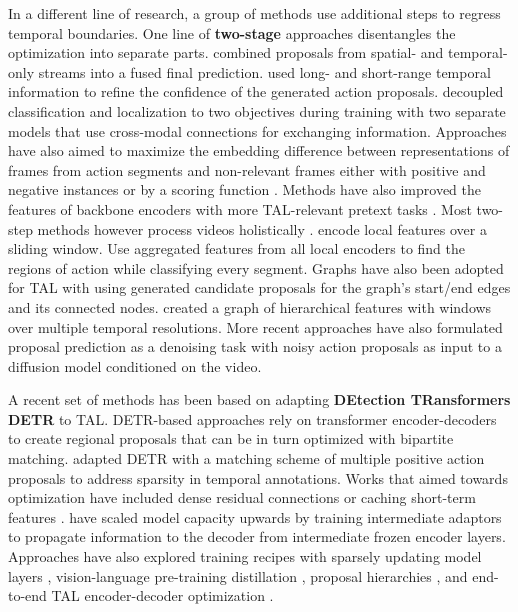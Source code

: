 \documentclass[smallextended,twocolumn,natbib]{svjour3}
\begin{document}
In a different line of research, a group of methods use additional steps to regress temporal boundaries. One line of \textbf{two-stage} approaches disentangles the optimization into separate parts. \citet{zhai2020two} combined proposals from spatial- and temporal-only streams into a fused final prediction. \citet{chen2022dcan} used long- and short-range temporal information to refine the confidence of the generated action proposals. \citet{huang2019decoupling} decoupled classification and localization to two objectives during training with two separate models that use cross-modal connections for exchanging information. Approaches have also aimed to maximize the embedding difference between representations of frames from action segments and non-relevant frames either with positive and negative instances \citep{luo2020weakly,zhang2021cola} or by a scoring function \citep{rizve2023pivotal}. Methods have also improved the features of backbone encoders with more TAL-relevant pretext tasks \citep{zhang2022unsupervised}. Most two-step methods however process videos holistically \citep{alwassel2021tsp,he2022asm,liu2021weakly,qing2021temporal}. \citet{alwassel2021tsp} encode local features over a sliding window. Use aggregated features from all local encoders to find the regions of action while classifying every segment. Graphs have also been adopted for TAL with \citet{bai2020boundary} using generated candidate proposals for the graph's start/end edges and its connected nodes. \citet{zhao2021video} created a graph of hierarchical features with windows over multiple temporal resolutions. More recent approaches \citep{nag2023difftad} have also formulated proposal prediction as a denoising task with noisy action proposals as input to a diffusion model conditioned on the video.

A recent set of methods has been based on adapting \textbf{DEtection TRansformers DETR} \citep{carion2020end} to TAL. DETR-based approaches rely on transformer encoder-decoders to create regional proposals that can be in turn optimized with bipartite matching. \citet{tan2021relaxed} adapted DETR with a matching scheme of multiple positive action proposals to address sparsity in temporal annotations. Works that aimed towards optimization have included dense residual connections \citep{zhao2023re2tal} or caching short-term features \citep{cheng2022tallformer,hong2022spotting}. 
\citet{liu2024end} have scaled model capacity upwards by training intermediate adaptors to propagate information to the decoder from intermediate frozen encoder layers. Approaches have also explored training recipes with sparsely updating model layers \citep{cheng2022stochastic}, vision-language pre-training distillation \citep{ju2023distilling}, proposal hierarchies \citep{wu2023newsnet},
and end-to-end TAL encoder-decoder optimization \citep{liu2022empirical}. 
\end{document}
